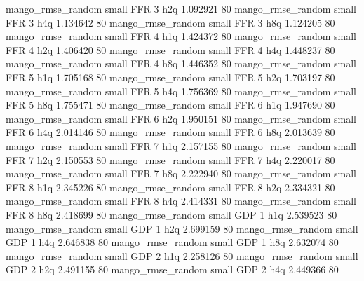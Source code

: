 mango_rmse_random      small      FFR                 3                  h2q 1.092921 80
mango_rmse_random      small      FFR                 3                  h4q 1.134642 80
mango_rmse_random      small      FFR                 3                  h8q 1.124205 80
mango_rmse_random      small      FFR                 4                  h1q 1.424372 80
mango_rmse_random      small      FFR                 4                  h2q 1.406420 80
mango_rmse_random      small      FFR                 4                  h4q 1.448237 80
mango_rmse_random      small      FFR                 4                  h8q 1.446352 80
mango_rmse_random      small      FFR                 5                  h1q 1.705168 80
mango_rmse_random      small      FFR                 5                  h2q 1.703197 80
mango_rmse_random      small      FFR                 5                  h4q 1.756369 80
mango_rmse_random      small      FFR                 5                  h8q 1.755471 80
mango_rmse_random      small      FFR                 6                  h1q 1.947690 80
mango_rmse_random      small      FFR                 6                  h2q 1.950151 80
mango_rmse_random      small      FFR                 6                  h4q 2.014146 80
mango_rmse_random      small      FFR                 6                  h8q 2.013639 80
mango_rmse_random      small      FFR                 7                  h1q 2.157155 80
mango_rmse_random      small      FFR                 7                  h2q 2.150553 80
mango_rmse_random      small      FFR                 7                  h4q 2.220017 80
mango_rmse_random      small      FFR                 7                  h8q 2.222940 80
mango_rmse_random      small      FFR                 8                  h1q 2.345226 80
mango_rmse_random      small      FFR                 8                  h2q 2.334321 80
mango_rmse_random      small      FFR                 8                  h4q 2.414331 80
mango_rmse_random      small      FFR                 8                  h8q 2.418699 80
mango_rmse_random      small      GDP                 1                  h1q 2.539523 80
mango_rmse_random      small      GDP                 1                  h2q 2.699159 80
mango_rmse_random      small      GDP                 1                  h4q 2.646838 80
mango_rmse_random      small      GDP                 1                  h8q 2.632074 80
mango_rmse_random      small      GDP                 2                  h1q 2.258126 80
mango_rmse_random      small      GDP                 2                  h2q 2.491155 80
mango_rmse_random      small      GDP                 2                  h4q 2.449366 80
